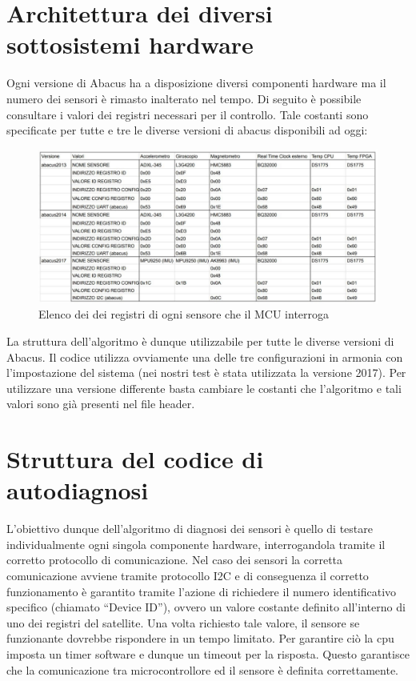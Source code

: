 \documentclass[LaM,binding=0.6cm]{../sapthesis}
\begin{document}
\section{Architettura dei diversi sottosistemi hardware}



Ogni versione di Abacus ha a disposizione diversi componenti hardware ma il numero dei sensori è rimasto inalterato nel tempo.
Di seguito è possibile consultare i valori dei registri necessari per il controllo. Tale costanti sono specificate per tutte e tre le diverse versioni di abacus disponibili ad oggi:

\begin{figure}[htbp]
\centerline{\includegraphics[scale=0.55]{examples/registerMapSensori.PNG}}
\caption{Elenco dei dei registri di ogni sensore che il MCU interroga}
\label{fig}
\end{figure}
\vspace{0.5cm}

La struttura dell'algoritmo è dunque utilizzabile per tutte le diverse versioni di Abacus.
Il codice utilizza ovviamente una delle tre configurazioni in armonia con l'impostazione del sistema (nei nostri test è stata utilizzata la versione 2017). Per utilizzare una versione differente basta cambiare le costanti che l'algoritmo e tali valori sono già presenti nel file header.


\section{Struttura del codice di autodiagnosi}

L’obiettivo dunque dell’algoritmo di diagnosi dei sensori è quello di testare individualmente ogni singola componente hardware, interrogandola tramite il corretto protocollo di comunicazione.
Nel caso dei sensori la corretta comunicazione avviene tramite protocollo I2C e di conseguenza il corretto funzionamento è garantito tramite l’azione di richiedere il numero identificativo specifico (chiamato “Device ID”), ovvero un valore costante definito all’interno di uno dei registri del satellite. Una volta richiesto tale valore, il sensore se funzionante dovrebbe rispondere in un tempo limitato. Per garantire ciò la cpu imposta un timer software e dunque un timeout per la risposta. Questo garantisce che la comunicazione tra microcontrollore ed il sensore è definita correttamente.
\end{document}
